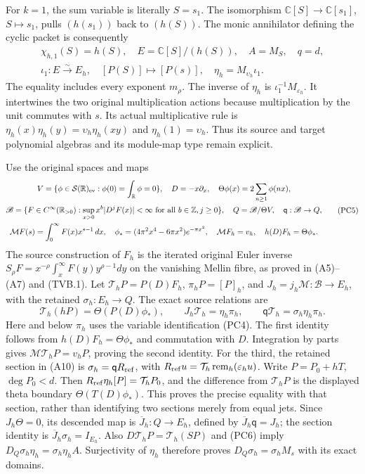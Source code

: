 For $k=1$, the sum variable is literally $S=s_1$.  The isomorphism
$\mathbb C[S]\to\mathbb C[s_1]$, $S\mapsto s_1$, pulls
$(h(s_1))$ back to $(h(S))$.  The monic annihilator defining the
cyclic packet is consequently
\[
 \begin{gathered}
 \chi_{h,1}(S)=h(S),\quad E=\mathbb C[S]/(h(S)),\quad
 A=M_S,\quad q=d,\\
 \iota_1:E\xrightarrow{\sim}E_h,\quad[P(S)]\mapsto[P(s)],
 \quad\eta_h=M_{\upsilon_h}\iota_1.
 \end{gathered}
 \tag{PC4}
\]
The equality includes every exponent $m_\rho$.  The inverse of
$\eta_h$ is $\iota_1^{-1}M_{\varepsilon_h}$.  It intertwines the
two original multiplication actions because multiplication by the unit
commutes with $s$.  Its actual multiplicative rule is
$\eta_h(x)\eta_h(y)=\upsilon_h\eta_h(xy)$ and
$\eta_h(1)=\upsilon_h$.  Thus its source and target polynomial
algebras and its module-map type remain explicit.

Use the original spaces and maps
\[
\begin{gathered}
 V=\{\phi\in\mathcal S(\mathbb R)_{\rm ev}:
             \phi(0)=\int_{\mathbb R}\phi=0\},\quad
 D=-x\partial_x,\quad\Theta\phi(x)=2\sum_{n\ge1}\phi(nx),\\
 \mathscr B=\{F\in C^\infty(\mathbb R_{>0}):\sup_{x>0}x^b|D^jF(x)|<\infty
                  \text{ for all }b\in\mathbb Z,j\ge0\},\quad
 Q=\mathscr B/\Theta V,\quad\mathsf q:\mathscr B\to Q,\\
 \mathcal MF(s)=\int_0^\infty F(x)x^{s-1}\,dx,\quad
 \phi_*=(4\pi^2x^4-6\pi x^2)e^{-\pi x^2},\quad
 \mathcal M F_h=v_h,\quad h(D)F_h=\Theta\phi_*.
\end{gathered}\tag{PC5}
\]
The source construction of $F_h$ is the iterated original Euler inverse
$S_\rho F=x^{-\rho}\int_x^\infty F(y)y^{\rho-1}dy$ on the
vanishing Mellin fibre, as proved in (A5)--(A7) and (TVB.1).
Let $\mathcal T_hP=P(D)F_h$, $\pi_hP=[P]_h$, and
$J_h=j_h\mathcal M:\mathscr B\to E_h$, with the retained
$\sigma_h:E_h\to Q$.  The exact source relations are
\[
 \mathcal T_h(hP)=\Theta(P(D)\phi_*),\qquad
 J_h\mathcal T_h=\eta_h\pi_h,\qquad
 \mathsf q\mathcal T_h=\sigma_h\eta_h\pi_h.
 \tag{PC6}
\]
Here and below $\pi_h$ uses the variable identification (PC4).
The first identity follows from $h(D)F_h=\Theta\phi_*$ and
commutation with $D$.  Integration by parts gives
$\mathcal M\mathcal T_hP=v_hP$, proving the second identity.
For the third, the retained section in (A10) is
$\sigma_h=\mathsf q R_{\rm ref}$, with
$R_{\rm ref}u=\mathcal T_h\operatorname{rem}_h(\varepsilon_hu)$.
Write $P=P_0+hT$, $\deg P_0<d$.  Then
$R_{\rm ref}\eta_h[P]=\mathcal T_hP_0$, and the difference from
$\mathcal T_hP$ is the displayed theta boundary
$\Theta(T(D)\phi_*)$.  This proves the precise equality with that
section, rather than identifying two sections merely from equal jets.
Since $J_h\Theta=0$, its descended map is
$\overline J_h:Q\to E_h$, defined by
$\overline J_h\mathsf q=J_h$; the section identity is
$\overline J_h\sigma_h=I_{E_h}$.
Also $D\mathcal T_hP=\mathcal T_h(SP)$ and (PC6) imply
$D_Q\sigma_h\eta_h=\sigma_h\eta_hA$.
Surjectivity of $\eta_h$ therefore proves
$D_Q\sigma_h=\sigma_hM_s$ with its exact domains.

